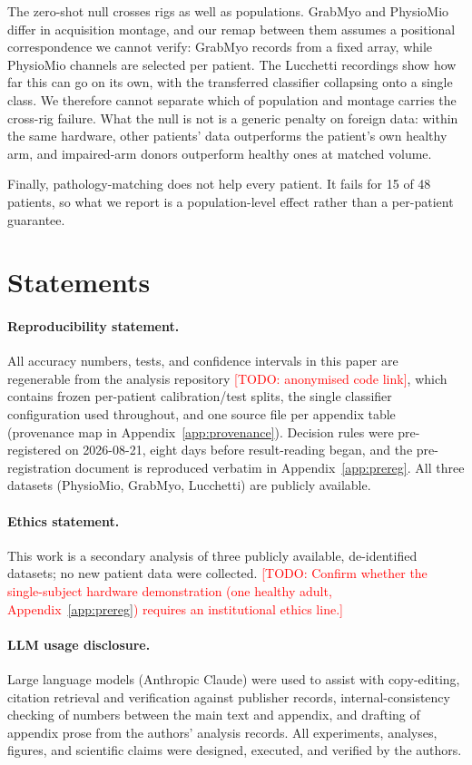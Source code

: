 \documentclass{article}
\newcommand{\todo}[1]{\textcolor{red}{[TODO: #1]}}
\begin{document}
The zero-shot null crosses rigs as well as populations. GrabMyo and PhysioMio differ in acquisition montage, and our remap between them assumes a positional correspondence we cannot verify: GrabMyo records from a fixed array, while PhysioMio channels are selected per patient. The Lucchetti recordings show how far this can go on its own, with the transferred classifier collapsing onto a single class. We therefore cannot separate which of population and montage carries the cross-rig failure. What the null is not is a generic penalty on foreign data: within the same hardware, other patients' data outperforms the patient's own healthy arm, and impaired-arm donors outperform healthy ones at matched volume.

Finally, pathology-matching does not help every patient. It fails for 15 of 48 patients, so what we report is a population-level effect rather than a per-patient guarantee.

\section*{Statements}

\paragraph{Reproducibility statement.} All accuracy numbers, tests, and confidence intervals in this paper are regenerable from the analysis repository \todo{anonymised code link}, which contains frozen per-patient calibration/test splits, the single classifier configuration used throughout, and one source file per appendix table (provenance map in Appendix~\ref{app:provenance}). Decision rules were pre-registered on 2026-08-21, eight days before result-reading began, and the pre-registration document is reproduced verbatim in Appendix~\ref{app:prereg}. All three datasets (PhysioMio, GrabMyo, Lucchetti) are publicly available.

\paragraph{Ethics statement.} This work is a secondary analysis of three publicly available, de-identified datasets; no new patient data were collected. \todo{Confirm whether the single-subject hardware demonstration (one healthy adult, Appendix~\ref{app:prereg}) requires an institutional ethics line.}

\paragraph{LLM usage disclosure.} Large language models (Anthropic Claude) were used to assist with copy-editing, citation retrieval and verification against publisher records, internal-consistency checking of numbers between the main text and appendix, and drafting of appendix prose from the authors' analysis records. All experiments, analyses, figures, and scientific claims were designed, executed, and verified by the authors.
\end{document}
